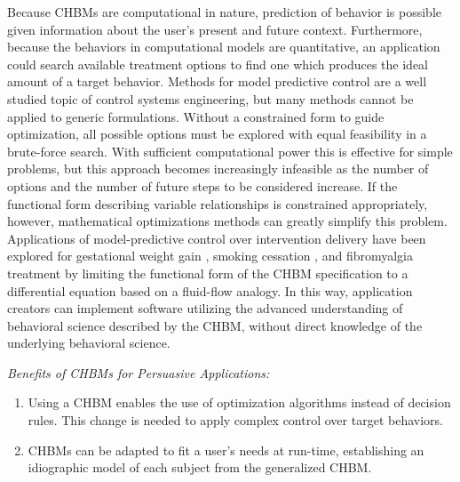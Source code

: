 \documentclass[runningheads,a4paper]{llncs}
\begin{document}
Because CHBMs are computational in nature, prediction of behavior is possible given information about the user's present and future context.
Furthermore, because the behaviors in computational models are quantitative, an application could search available treatment options to find one which produces the ideal amount of a target behavior.
Methods for model predictive control are a well studied topic of control systems engineering, but many methods cannot be applied to generic formulations.
Without a constrained form to guide optimization, all possible options must be explored with equal feasibility in a brute-force search.
With sufficient computational power this is effective for simple problems, but this approach becomes increasingly infeasible as the number of options and the number of future steps to be considered increase.
If the functional form describing variable relationships is constrained appropriately, however, mathematical optimizations methods can greatly simplify this problem.
Applications of model-predictive control over intervention delivery have been explored for gestational weight gain \cite{dong2013hybrid}, smoking cessation \cite{timms2014hybrid}, and fibromyalgia treatment \cite{deshpande2014optimized} by limiting the functional form of the CHBM specification to a differential equation based on a fluid-flow analogy.
In this way, application creators can implement software utilizing the advanced understanding of behavioral science described by the CHBM, without direct knowledge of the underlying behavioral science.


\emph{Benefits of CHBMs for Persuasive Applications:}
\begin{enumerate}
    \item Using a CHBM enables the use of optimization algorithms instead of decision rules. This change is needed to apply complex control over target behaviors.
    \item CHBMs can be adapted to fit a user's needs at run-time, establishing an idiographic model of each subject from the generalized CHBM.
\end{enumerate}
\end{document}
